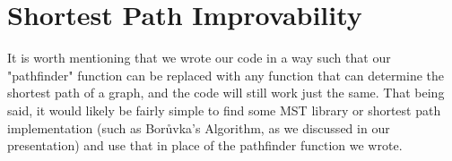 \documentclass[12pt,letterpaper]{article}
\begin{document}
\section*{Shortest Path Improvability}

It is worth mentioning that we wrote our code in a way such that our "pathfinder" function can be replaced with any function that can determine the shortest path of a graph, and the code will still work just the same. That being said, it would likely be fairly simple to find some MST library or shortest path implementation (such as Bor\r{u}vka's Algorithm, as we discussed in our presentation) and use that in place of the pathfinder function we wrote.

\newpage
\end{document}

